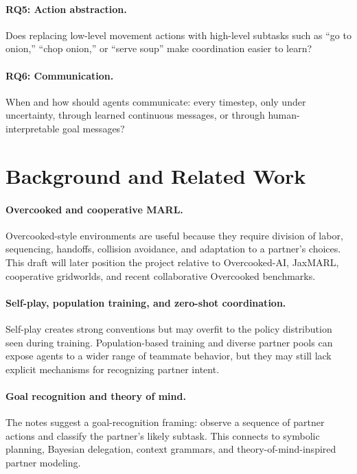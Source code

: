 \documentclass[letterpaper]{article} %
\begin{document}
\paragraph{RQ5: Action abstraction.}
Does replacing low-level movement actions with high-level subtasks such as ``go to onion,'' ``chop onion,'' or ``serve soup'' make coordination easier to learn?

\paragraph{RQ6: Communication.}
When and how should agents communicate: every timestep, only under uncertainty, through learned continuous messages, or through human-interpretable goal messages?

\section{Background and Related Work}

\paragraph{Overcooked and cooperative MARL.}
Overcooked-style environments are useful because they require division of labor, sequencing, handoffs, collision avoidance, and adaptation to a partner's choices. This draft will later position the project relative to Overcooked-AI, JaxMARL, cooperative gridworlds, and recent collaborative Overcooked benchmarks.

\paragraph{Self-play, population training, and zero-shot coordination.}
Self-play creates strong conventions but may overfit to the policy distribution seen during training. Population-based training and diverse partner pools can expose agents to a wider range of teammate behavior, but they may still lack explicit mechanisms for recognizing partner intent.

\paragraph{Goal recognition and theory of mind.}
The notes suggest a goal-recognition framing: observe a sequence of partner actions and classify the partner's likely subtask. This connects to symbolic planning, Bayesian delegation, context grammars, and theory-of-mind-inspired partner modeling.
\end{document}
